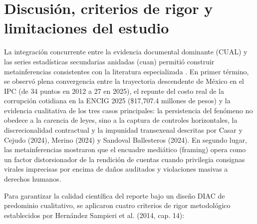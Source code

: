 

\section{Discusión, criterios de rigor y limitaciones del estudio}

La integración concurrente entre la evidencia documental dominante (CUAL) y las series estadísticas secundarias anidadas (cuan) permitió construir metainferencias consistentes con la literatura especializada \citep{hernandez2014}. En primer término, se observó plena convergencia entre la trayectoria descendente de México en el IPC (de 34 puntos en 2012 a 27 en 2025), el repunte del costo real de la corrupción cotidiana en la ENCIG 2025 (\$17,707.4 millones de pesos) y la evidencia cualitativa de los tres casos principales: la persistencia del fenómeno no obedece a la carencia de leyes, sino a la captura de controles horizontales, la discrecionalidad contractual y la impunidad transexenal descritas por Casar y Cejudo (2024), Merino (2024) y Sandoval Ballesteros (2024). En segundo lugar, las metainferencias mostraron que el encuadre mediático (framing) opera como un factor distorsionador de la rendición de cuentas cuando privilegia consignas virales imprecisas por encima de daños auditados y violaciones masivas a derechos humanos.

Para garantizar la calidad científica del reporte bajo un diseño DIAC de predominio cualitativo, se aplicaron cuatro criterios de rigor metodológico establecidos por Hernández Sampieri et al. (2014, cap. 14):

